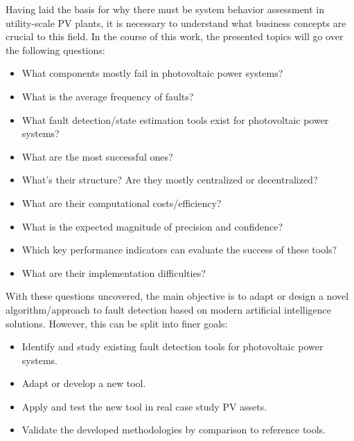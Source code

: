 Having laid the basis for why there must be system behavior assessment in utility-scale PV plants, it is necessary to understand what business concepts are crucial to this field. In the course of this work, the presented topics will go over the following questions:

\begin{itemize}
    \item What components mostly fail in photovoltaic power systems?
    \item What is the average frequency of faults?
    \item What fault detection/state estimation tools exist for photovoltaic
    power systems?
    \item What are the most successful ones?
    \item What's their structure? Are they mostly centralized or decentralized?
    \item What are their computational costs/efficiency?
    \item What is the expected magnitude of precision and confidence?
    \item Which key performance indicators can evaluate the success of these
    tools? 
    \item What are their implementation difficulties?
\end{itemize}

With these questions uncovered, the main objective is to adapt or design a novel algorithm/approach to fault detection based on modern artificial intelligence solutions. However, this can be split into finer goals:

\begin{itemize}
    \item  Identify and study existing fault detection tools for photovoltaic
    power systems.
    \item  Adapt or develop a new tool.
    \item Apply and test the new tool in real case study PV assets.
    \item Validate the developed methodologies by comparison to reference tools.
\end{itemize}

